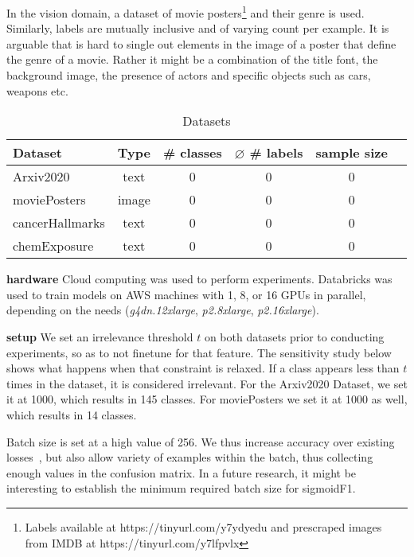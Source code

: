 In the vision domain, a dataset of movie posters\footnote{Labels available at https://tinyurl.com/y7ydyedu and prescraped images from IMDB at https://tinyurl.com/y7lfpvlx} and their genre is used. Similarly, labels are mutually inclusive and of varying count per example. It is arguable that is hard to single out elements in the image of a poster that define the genre of a movie. Rather it might be a combination of the title font, the background image, the presence of actors and specific objects such as cars, weapons etc.

\begin{table}
\caption{Datasets}
\label{tab:arxiv2020}
\centering
\begin{tabular}{l ccccc}
\toprule
Dataset & Type & \# classes & $\varnothing$ \# labels & sample size\\
\midrule
Arxiv2020 & text & 0 & 0 & 0\\
moviePosters & image & 0 & 0 & 0\\
cancerHallmarks & text & 0 & 0 & 0\\
chemExposure & text & 0 & 0 & 0\\
\bottomrule
\end{tabular}
\end{table}




\textbf{hardware}
Cloud computing was used to perform experiments. Databricks was used to train models on AWS machines with 1, 8, or 16 GPUs in parallel, depending on the needs (\textit{g4dn.12xlarge}, \textit{p2.8xlarge}, \textit{p2.16xlarge}). 


\textbf{setup}
We set an irrelevance threshold $t$ on both datasets prior to conducting experiments, so as to not finetune for that feature. The sensitivity study below shows what happens when that constraint is relaxed. If a class appears less than $t$ times in the dataset, it is considered irrelevant. For the Arxiv2020 Dataset, we set it at 1000, which results in 145 classes. For moviePosters we set it at 1000 as well, which results in 14 classes.

Batch size is set at a high value of 256. We thus increase accuracy over existing losses~\cite{bigBS}, but also allow variety of examples within the batch, thus collecting enough values in the confusion matrix. In a future research, it might be interesting to establish the minimum required batch size for sigmoidF1.

